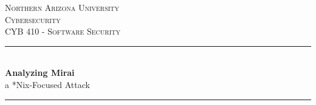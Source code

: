 \documentclass[12pt, letterpaper]{article}
\begin{document}
\newcommand{\paperauthor}{Akiel Aries}
\newcommand{\papersupervisor}{Prof. Sareh Assiri}
\newcommand{\paperuniversity}{Northern Arizona University}

\newcommand{\papertitle}{Analyzing Mirai}
\newcommand{\paperminortitle}{a *Nix-Focused Attack}
\newcommand{\papermajorheading}{Cybersecurity}
\newcommand{\paperminorheading}{CYB 410 - Software Security}

\newcommand{\HRule}{\rule{\linewidth}{0.5mm}} %

\center %


\textsc{\LARGE \paperuniversity}\\[1.0cm] %
\textsc{\Large \papermajorheading}\\[0.2cm] %
\textsc{\large \paperminorheading}\\[0.75cm] %


\HRule \\[0.4cm]
{ \huge \bfseries \papertitle}\\[0.05cm] %
{ \huge \paperminortitle}\\[0.025cm] %
\HRule \\[3.5cm]

\begin{center}
\end{center}
\end{document}
